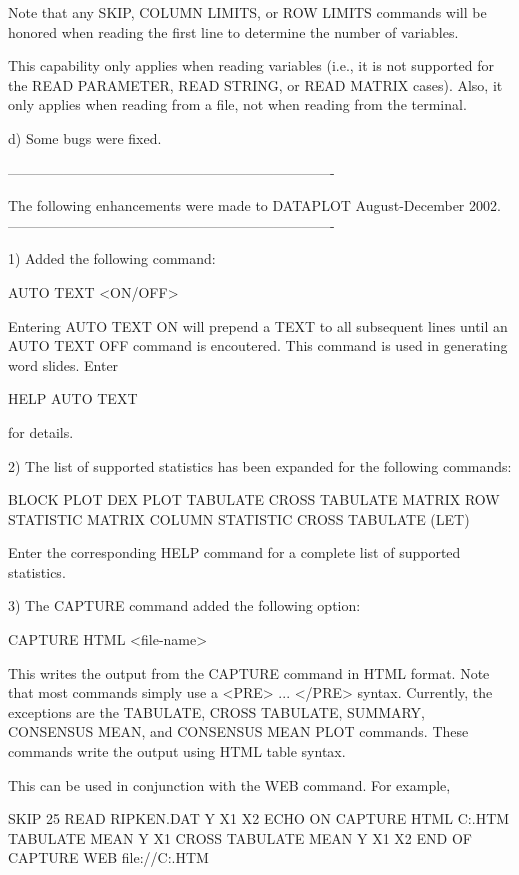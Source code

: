 {           Note that any SKIP, COLUMN LIMITS, or ROW LIMITS
           commands will be honored when reading the first
           line to determine the number of variables.
           
       This capability only applies when reading variables (i.e.,
       it is not supported for the READ PARAMETER, READ STRING,
       or READ MATRIX cases).  Also, it only applies when reading
       from a file, not when reading from the terminal.

    d) Some bugs were fixed.

----------------------------------------------------------------------

The following enhancements were made to DATAPLOT August-December 2002.
----------------------------------------------------------------------

 1) Added the following command:

       AUTO TEXT <ON/OFF>

    Entering AUTO TEXT ON will prepend a TEXT to all subsequent
    lines until an AUTO TEXT OFF command is encoutered.  This
    command is used in generating word slides.  Enter

        HELP AUTO TEXT

    for details.

 2) The list of supported statistics has been expanded for the
    following commands:

      BLOCK PLOT
      DEX PLOT
      TABULATE
      CROSS TABULATE
      MATRIX ROW STATISTIC
      MATRIX COLUMN STATISTIC
      CROSS TABULATE (LET)

    Enter the corresponding HELP command for a complete list
    of supported statistics.

 3) The CAPTURE command added the following option:

       CAPTURE HTML <file-name>

    This writes the output from the CAPTURE command in HTML
    format.  Note that most commands simply use a
    <PRE> ... </PRE> syntax.  Currently, the exceptions are the
    TABULATE, CROSS TABULATE, SUMMARY, CONSENSUS MEAN, and
    CONSENSUS MEAN PLOT commands.  These commands write the output
    using HTML table syntax.

    This can be used in conjunction with the WEB command.  For
    example,

       SKIP 25
       READ RIPKEN.DAT Y X1 X2
       ECHO ON
       CAPTURE HTML C:\TABLE.HTM
       TABULATE MEAN Y X1
       CROSS TABULATE MEAN Y X1 X2
       END OF CAPTURE
       WEB file://C:\TABLE.HTM

}
